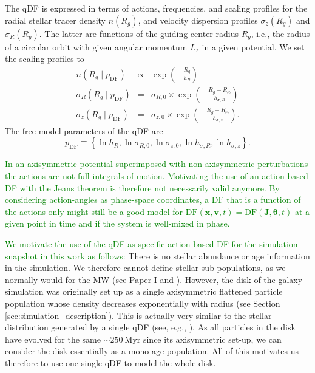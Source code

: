 \documentclass[iop,revtex4,numberedappendix,appendixfloats]{emulateapj}
\newcommand{\vect}[1]{\boldsymbol{#1}}
\newcommand{\NEW}[1]{\textcolor{Green}{#1}}
\newcommand{\OLD}[1]{}
\begin{document}
The qDF is expressed in terms of actions, frequencies, and scaling profiles for the radial stellar tracer density $n(R_g)$, and velocity dispersion profiles $\sigma_z(R_g)$ and $\sigma_R(R_g)$. The latter are functions of the guiding-center radius $R_g$, i.e., the radius of a circular orbit with given angular momentum $L_z$ in a given potential. We set the scaling profiles to
\begin{eqnarray}
n(R_g \mid p_\text{DF}) &\propto& \exp\left(-\frac{R_g}{h_R} \right)\\
\sigma_R(R_g \mid p_\text{DF}) &=& \sigma_{R,0} \times \exp\left(- \frac{R_g-R_\odot}{h_{\sigma,R}} \right)\label{eq:sigmaRRg}\\
\sigma_z(R_g \mid p_\text{DF}) &=& \sigma_{z,0} \times \exp\left(- \frac{R_g-R_\odot}{h_{\sigma,z}} \right)\label{eq:sigmazRg}.
\end{eqnarray}
The free model parameters of the qDF are
\begin{equation}
p_\text{DF} \equiv \left\{ \ln h_R, \ln \sigma_{R,0}, \ln \sigma_{z,0}, \ln h_{\sigma,R}, \ln h_{\sigma,z}\right\}. \label{eq:qDF_parameters}
\end{equation}

\NEW{In an axisymmetric potential superimposed with non-axisymmetric perturbations the actions are not full integrals of motion. Motivating the use of an action-based DF with the Jeans theorem is therefore not necessarily valid anymore. By considering action-angles as phase-space coordinates, a DF that is a function of the actions only might still be a good model for $\text{DF}(\vect{x},\vect{v},t)= \text{DF}(\vect{J},\vect{\theta},t)$ at a given point in time and if the system is well-mixed in phase.}

\NEW{We motivate the use of the qDF as specific action-based DF for the simulation snapshot in this work as follows:} There is no stellar abundance or age information in the simulation\OLD{ snapshot used in this work}. We therefore cannot define stellar sub-populations, as we normally would for the MW (see Paper I and \citealt{2013ApJ...779..115B}). However, the disk of the galaxy simulation was originally set up as a single axisymmetric flattened particle population whose density decreases exponentially with radius (see Section \ref{sec:simulation_description}). This is actually very similar to the stellar distribution generated by a single qDF (see, e.g., \citealt{2013MNRAS.434..652T}). As all particles in the disk have evolved for the same $\sim 250~\text{Myr}$ since its axisymmetric set-up, we can consider the disk essentially as a mono-age population. All of this motivates us therefore to use one single qDF to model the whole disk.
\end{document}
